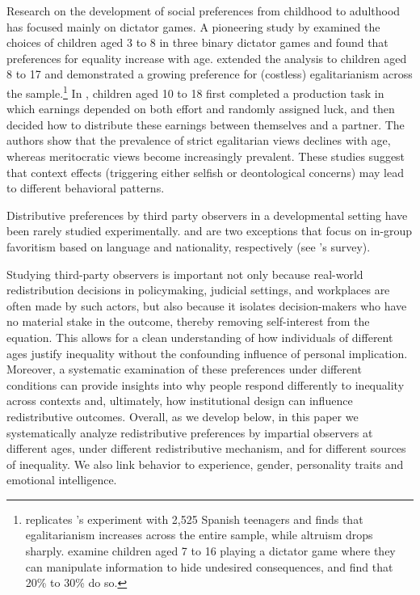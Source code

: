 \documentclass[11pt]{article}
\begin{document}
 
Research on the development of social preferences from childhood to adulthood has focused mainly on dictator games. 
A pioneering study by \citet{Fehr2008} examined the choices of children aged 3 to 8 in three binary dictator games and found that preferences for equality increase with age. \citet{fehr2013development} extended the analysis to children aged 8 to 17 and demonstrated a growing preference for (costless) egalitarianism across the sample.\footnote{\citet{branas2024} replicates \citet{Fehr2008}'s experiment with 2,525 Spanish teenagers and finds that egalitarianism increases across the entire sample, while altruism drops sharply. \citet{brocas2020development} examine children aged 7 to 16 playing a dictator game where they can manipulate information to hide undesired consequences, and find that  20\% to 30\% do so.}
In \citet{almaas2010fairness}, children aged 10 to 18 first completed a production task in which earnings depended on both effort and randomly assigned luck, and then decided how to distribute these earnings between themselves and a partner. The authors show that the prevalence of strict egalitarian views declines with age, whereas meritocratic views become increasingly prevalent. These studies suggest that context effects (triggering either selfish or deontological concerns) may lead to different behavioral patterns.




Distributive preferences by third party observers in a developmental setting have been rarely studied experimentally. \citet{angerer2017} and  \citet{barron2023discrimination} are two exceptions that focus on in-group favoritism based on language and nationality, respectively (see \citet{sutter2019survey}'s survey).  

Studying third-party observers is important not only because real-world redistribution decisions in policymaking, judicial settings, and workplaces are often made by such actors, but also because it isolates decision-makers who have no material stake in the outcome, thereby removing self-interest from the equation. This allows for a clean understanding of how individuals of different ages justify inequality without the confounding influence of personal implication. Moreover, a systematic examination of these preferences under different conditions can provide insights into why people respond differently to inequality across contexts and, ultimately, how institutional design can influence redistributive outcomes. 
Overall, as we develop below, in this paper we systematically analyze redistributive preferences by impartial observers at different ages, under different redistributive mechanism, and for different sources of inequality. We also link behavior to experience, gender, personality traits and emotional intelligence.
\end{document}
